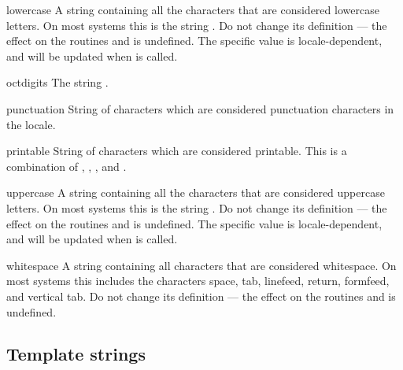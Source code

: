 \begin{datadesc}{lowercase}
  A string containing all the characters that are considered lowercase
  letters.  On most systems this is the string
  .  Do not change its definition ---
  the effect on the routines  and
   is undefined.  The specific value is
  locale-dependent, and will be updated when
   is called.
\end{datadesc}

\begin{datadesc}{octdigits}
  The string .
\end{datadesc}

\begin{datadesc}{punctuation}
  String of \ASCII{} characters which are considered punctuation
  characters in the  locale.
\end{datadesc}

\begin{datadesc}{printable}
  String of characters which are considered printable.  This is a
  combination of , ,
  , and .
\end{datadesc}

\begin{datadesc}{uppercase}
  A string containing all the characters that are considered uppercase
  letters.  On most systems this is the string
  .  Do not change its definition ---
  the effect on the routines  and
   is undefined.  The specific value is
  locale-dependent, and will be updated when
   is called.
\end{datadesc}

\begin{datadesc}{whitespace}
  A string containing all characters that are considered whitespace.
  On most systems this includes the characters space, tab, linefeed,
  return, formfeed, and vertical tab.  Do not change its definition ---
  the effect on the routines  and 
  is undefined.
\end{datadesc}

\subsection{Template strings}

